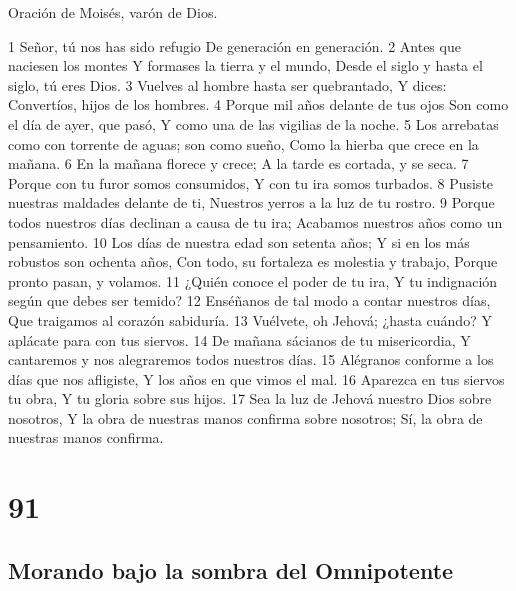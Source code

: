 Oración de Moisés, varón de Dios.

1 Señor, tú nos has sido refugio
De generación en generación.
2 Antes que naciesen los montes
Y formases la tierra y el mundo,
Desde el siglo y hasta el siglo, tú eres Dios.
3 Vuelves al hombre hasta ser quebrantado,
Y dices: Convertíos, hijos de los hombres.
4 Porque mil años delante de tus ojos
Son como el día de ayer, que pasó,
Y como una de las vigilias de la noche.
5 Los arrebatas como con torrente de aguas; son como sueño,
Como la hierba que crece en la mañana.
6 En la mañana florece y crece;
A la tarde es cortada, y se seca.
7 Porque con tu furor somos consumidos,
Y con tu ira somos turbados.
8 Pusiste nuestras maldades delante de ti,
Nuestros yerros a la luz de tu rostro.
9 Porque todos nuestros días declinan a causa de tu ira;
Acabamos nuestros años como un pensamiento.
10 Los días de nuestra edad son setenta años;
Y si en los más robustos son ochenta años,
Con todo, su fortaleza es molestia y trabajo,
Porque pronto pasan, y volamos.
11 ¿Quién conoce el poder de tu ira,
Y tu indignación según que debes ser temido?
12 Enséñanos de tal modo a contar nuestros días,
Que traigamos al corazón sabiduría.
13 Vuélvete, oh Jehová; ¿hasta cuándo?
Y aplácate para con tus siervos.
14 De mañana sácianos de tu misericordia,
Y cantaremos y nos alegraremos todos nuestros días.
15 Alégranos conforme a los días que nos afligiste,
Y los años en que vimos el mal.
16 Aparezca en tus siervos tu obra,
Y tu gloria sobre sus hijos.
17 Sea la luz de Jehová nuestro Dios sobre nosotros,
Y la obra de nuestras manos confirma sobre nosotros;
Sí, la obra de nuestras manos confirma.

\chapter{91}

\section*{Morando bajo la sombra del Omnipotente}

